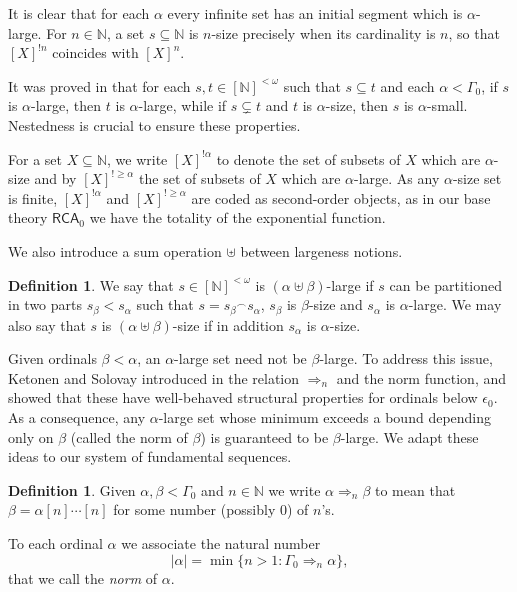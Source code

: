 \documentclass[11pt]{amsart}
\theoremstyle{definition}
\newtheorem{definition}[thm]{Definition}
\theoremstyle{remark}
\theoremstyle{plain}
\newcommand{\numberset}{\mathbb}
\newcommand{\N}{\numberset{N}}
\def\om{\omega}
\def\a{\alpha}
\def\b{\beta}
\def\G{\Gamma}
\def\conc{{}^\smallfrown}
\newcommand{\RCA}{\mathsf{RCA}_0}
\def\N{{\mathbb{N}}}
\begin{document}
It is clear that for each $\a$ every infinite set has an initial segment which is $\a$-large. For $n \in \mathbb{N}$, a set $s\subseteq\N$ is $n$-size precisely when its cardinality is $n$, so that $[X]^{!n}$ coincides with $[X]^n$.

It was proved in \cite{marcone2025} that for each $s, t \in [\N]^{< \om}$ such that $s \subseteq t$ and each $\a < \G_0$, if $s$ is $\a$-large, then $t$ is $\a$-large, while if $s \subsetneq t$ and $t$ is $\a$-size, then $s$ is $\a$-small. Nestedness is crucial to ensure these properties.

For a set $X\subseteq \N$, we write $[X]^{!\alpha}$ to denote the set of subsets of $X$ which are $\alpha$-size and by $[X]^{! \ge \a}$ the set of subsets of $X$ which are $\a$-large.
As any $\alpha$-size set is finite, $[X]^{!\alpha}$ and $[X]^{! \ge \a}$ are coded as second-order objects, as in our base theory $\RCA$ we have the totality of the exponential function.

We also introduce a sum operation $\uplus$ between largeness notions.

\begin{definition}
We say that $s \in [\N]^{< \om}$ is $(\alpha \uplus \beta)$-large if $s$ can be partitioned in two parts $s_\beta < s_\alpha$ such that $s = s_\beta \conc s_\alpha$, $s_\beta$ is $\beta$-size and $s_\alpha$ is $\alpha$-large.
We may also say that $s$ is $(\alpha \uplus \beta)$-size if in addition $s_\alpha$ is $\alpha$-size.
\end{definition}

Given ordinals $\beta < \alpha$, an $\alpha$-large set need not be $\beta$-large. 
To address this issue, Ketonen and Solovay introduced in \cite{ketonensolovay} the relation $\Rightarrow_n$ and the norm function, and showed that these have well-behaved structural properties for ordinals below $\epsilon_0$. 
As a consequence, any $\alpha$-large set whose minimum exceeds a bound depending only on $\beta$ (called the norm of $\beta$) is guaranteed to be $\beta$-large.
We adapt these ideas to our system of fundamental sequences.
		
\begin{definition}\label{normdefinition}
Given $\a, \b < \G_0$ and $n\in\N$ we write $\a \Rightarrow_n \b$ to mean that $\b = \a[n]\cdots [n]$ for some number (possibly $0$) of $n$'s.

To each ordinal $\a$ we associate the natural number 
$$|\a| = \min \{n > 1 : \G_0 \Rightarrow_n \a \},$$ 
that we call the \textit{norm} of $\a$.
\end{definition}
\end{document}
